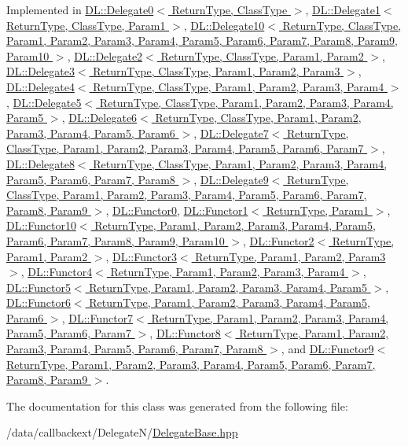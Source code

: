 Implemented in \hyperlink{classDL_1_1Delegate0_a2}{DL::Delegate0$<$ Return\-Type, Class\-Type $>$}, \hyperlink{classDL_1_1Delegate1_a2}{DL::Delegate1$<$ Return\-Type, Class\-Type, Param1 $>$}, \hyperlink{classDL_1_1Delegate10_a2}{DL::Delegate10$<$ Return\-Type, Class\-Type, Param1, Param2, Param3, Param4, Param5, Param6, Param7, Param8, Param9, Param10 $>$}, \hyperlink{classDL_1_1Delegate2_a2}{DL::Delegate2$<$ Return\-Type, Class\-Type, Param1, Param2 $>$}, \hyperlink{classDL_1_1Delegate3_a2}{DL::Delegate3$<$ Return\-Type, Class\-Type, Param1, Param2, Param3 $>$}, \hyperlink{classDL_1_1Delegate4_a2}{DL::Delegate4$<$ Return\-Type, Class\-Type, Param1, Param2, Param3, Param4 $>$}, \hyperlink{classDL_1_1Delegate5_a2}{DL::Delegate5$<$ Return\-Type, Class\-Type, Param1, Param2, Param3, Param4, Param5 $>$}, \hyperlink{classDL_1_1Delegate6_a2}{DL::Delegate6$<$ Return\-Type, Class\-Type, Param1, Param2, Param3, Param4, Param5, Param6 $>$}, \hyperlink{classDL_1_1Delegate7_a2}{DL::Delegate7$<$ Return\-Type, Class\-Type, Param1, Param2, Param3, Param4, Param5, Param6, Param7 $>$}, \hyperlink{classDL_1_1Delegate8_a2}{DL::Delegate8$<$ Return\-Type, Class\-Type, Param1, Param2, Param3, Param4, Param5, Param6, Param7, Param8 $>$}, \hyperlink{classDL_1_1Delegate9_a2}{DL::Delegate9$<$ Return\-Type, Class\-Type, Param1, Param2, Param3, Param4, Param5, Param6, Param7, Param8, Param9 $>$}, \hyperlink{classDL_1_1Functor0_a2}{DL::Functor0}, \hyperlink{classDL_1_1Functor1_a2}{DL::Functor1$<$ Return\-Type, Param1 $>$}, \hyperlink{classDL_1_1Functor10_a2}{DL::Functor10$<$ Return\-Type, Param1, Param2, Param3, Param4, Param5, Param6, Param7, Param8, Param9, Param10 $>$}, \hyperlink{classDL_1_1Functor2_a2}{DL::Functor2$<$ Return\-Type, Param1, Param2 $>$}, \hyperlink{classDL_1_1Functor3_a2}{DL::Functor3$<$ Return\-Type, Param1, Param2, Param3 $>$}, \hyperlink{classDL_1_1Functor4_a2}{DL::Functor4$<$ Return\-Type, Param1, Param2, Param3, Param4 $>$}, \hyperlink{classDL_1_1Functor5_a2}{DL::Functor5$<$ Return\-Type, Param1, Param2, Param3, Param4, Param5 $>$}, \hyperlink{classDL_1_1Functor6_a2}{DL::Functor6$<$ Return\-Type, Param1, Param2, Param3, Param4, Param5, Param6 $>$}, \hyperlink{classDL_1_1Functor7_a2}{DL::Functor7$<$ Return\-Type, Param1, Param2, Param3, Param4, Param5, Param6, Param7 $>$}, \hyperlink{classDL_1_1Functor8_a2}{DL::Functor8$<$ Return\-Type, Param1, Param2, Param3, Param4, Param5, Param6, Param7, Param8 $>$}, and \hyperlink{classDL_1_1Functor9_a2}{DL::Functor9$<$ Return\-Type, Param1, Param2, Param3, Param4, Param5, Param6, Param7, Param8, Param9 $>$}.

The documentation for this class was generated from the following file:\begin{CompactItemize}
\item 
/data/callbackext/Delegate\-N/\hyperlink{DelegateBase_8hpp}{Delegate\-Base.hpp}\end{CompactItemize}
